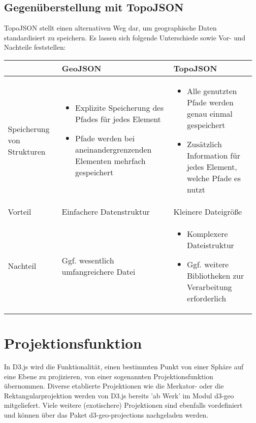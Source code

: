 \subsection{Gegenüberstellung mit TopoJSON}

TopoJSON stellt einen alternativen Weg dar, um geographische Daten standardisiert zu speichern. Es lassen sich folgende Unterschiede sowie Vor- und Nachteile feststellen:

\begin{tabular}{p{} | p{} | p{}}
    & 
    GeoJSON 
    & TopoJSON \\\hline
    Speicherung von Strukturen 
    & \begin{itemize}
        \item Explizite Speicherung des Pfades für jedes Element
        \item Pfade werden bei aneinandergrenzenden Elementen mehrfach gespeichert
    \end{itemize} 
    & \begin{itemize}
        \item Alle genutzten Pfade werden genau einmal gespeichert
        \item Zusätzlich Information für jedes Element, welche Pfade es nutzt
    \end{itemize} \\\hline
    Vorteil 
    & Einfachere Datenstruktur
    & Kleinere Dateigröße \\\hline
    Nachteil
    & Ggf. wesentlich umfangreichere Datei 
    & \begin{itemize}
        \item Komplexere Dateistruktur
        \item Ggf. weitere Bibliotheken zur Verarbeitung erforderlich
    \end{itemize} \\
\end{tabular}

\section{Projektionsfunktion}

In D3.js wird die Funktionalität, einen bestimmten Punkt von einer Sphäre auf eine Ebene zu projizieren, von einer sogenannten Projektionsfunktion übernommen. Diverse etablierte Projektionen wie die Merkator- oder die Rektangularprojektion werden von D3.js bereits 'ab Werk' im Modul d3-geo mitgeliefert. Viele weitere (exotischere) Projektionen sind ebenfalls vordefiniert und können über das Paket d3-geo-projections nachgeladen werden.

